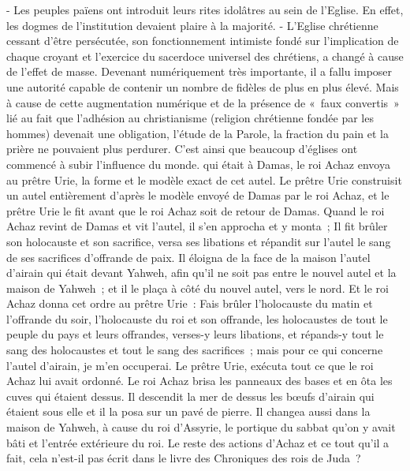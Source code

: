 \begin{multicols}{2}
{- Les peuples païens ont introduit leurs rites idolâtres au sein de l'Eglise. En effet, les dogmes de l'institution devaient plaire à la majorité.
- L'Eglise chrétienne cessant d'être persécutée, son fonctionnement intimiste fondé sur l'implication de chaque croyant et l'exercice du sacerdoce universel des chrétiens, a changé à cause de l'effet de masse. Devenant numériquement très importante, il a fallu imposer une autorité capable de contenir un nombre de fidèles de plus en plus élevé. Mais à cause de cette augmentation numérique et de la présence de «~faux convertis~» lié au fait que l'adhésion au christianisme (religion chrétienne fondée par les hommes) devenait une obligation, l'étude de la Parole, la fraction du pain et la prière ne pouvaient plus perdurer. C'est ainsi que beaucoup d'églises ont commencé à subir l'influence du monde.} qui était à Damas, le roi Achaz envoya au prêtre Urie, la forme et le modèle exact de cet autel.
Le prêtre Urie construisit un autel entièrement d'après le modèle envoyé de Damas par le roi Achaz, et le prêtre Urie le fit avant que le roi Achaz soit de retour de Damas.
Quand le roi Achaz revint de Damas et vit l'autel, il s'en approcha et y monta~;
Il fit brûler son holocauste et son sacrifice, versa ses libations et répandit sur l'autel le sang de ses sacrifices d'offrande de paix.
Il éloigna de la face de la maison l'autel d'airain qui était devant Yahweh, afin qu'il ne soit pas entre le nouvel autel et la maison de Yahweh~; et il le plaça à côté du nouvel autel, vers le nord.
Et le roi Achaz donna cet ordre au prêtre Urie~: Fais brûler l'holocauste du matin et l'offrande du soir, l'holocauste du roi et son offrande, les holocaustes de tout le peuple du pays et leurs offrandes, verses-y leurs libations, et répands-y tout le sang des holocaustes et tout le sang des sacrifices~; mais pour ce qui concerne l'autel d'airain, je m'en occuperai.
Le prêtre Urie, exécuta tout ce que le roi Achaz lui avait ordonné.
Le roi Achaz brisa les panneaux des bases et en ôta les cuves qui étaient dessus. Il descendit la mer de dessus les bœufs d'airain qui étaient sous elle et il la posa sur un pavé de pierre.
Il changea aussi dans la maison de Yahweh, à cause du roi d'Assyrie, le portique du sabbat qu'on y avait bâti et l'entrée extérieure du roi.
Le reste des actions d'Achaz et ce tout qu'il a fait, cela n'est-il pas écrit dans le livre des Chroniques des rois de Juda~?

\end{multicols}

